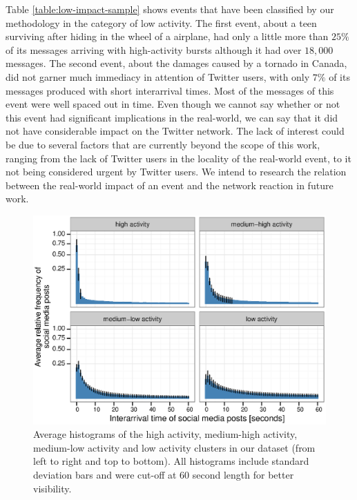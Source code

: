 Table \ref{table:low-impact-sample} shows events that have been classified by
our methodology in the category of low activity. 
%
The first event, about a teen surviving after hiding in the wheel of a airplane,
had only a little more than $25\%$ of its messages arriving with high-activity
bursts although it had over $18,000$ messages.  
%
The second event, about the damages caused by a tornado in Canada, did not
garner much immediacy in attention of Twitter users, with only $7\%$ of its
messages produced with short interarrival times. 
%
Most of the messages of this event were well spaced out in time. 
%
Even though we cannot say whether or not this event had significant implications
in the real-world, we can say that it did not have considerable impact on the
Twitter network. 
%
The lack of interest could be due to several factors that are currently beyond
the scope of this work, ranging from the lack of Twitter users in the locality
of the real-world event, to it not being considered urgent by Twitter users. 
%
We intend to research the relation between the real-world impact of an event and
the network reaction in future work.


\begin{figure}[!htb]
  \centering
   \includegraphics[width=\textwidth]{figures/high-activity/fig4}
  \caption[Average histograms of activity levels]{Average histograms of the high
      activity, medium-high activity, medium-low activity and low activity
      clusters in our dataset (from left to right and top to bottom). All
      histograms include standard deviation bars and were cut-off at 60 second
      length for better visibility.
    }\label{fig:hi:avg-hist}
\end{figure}

